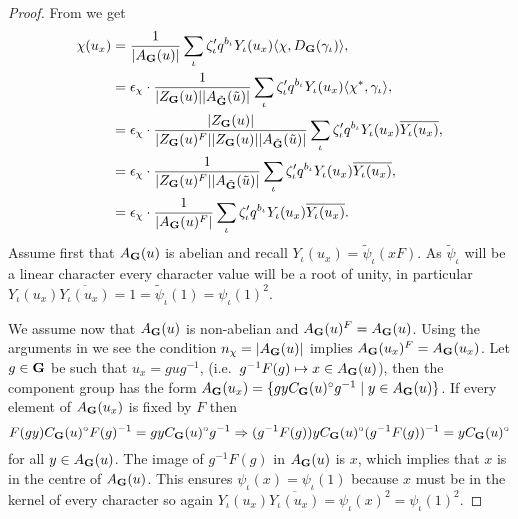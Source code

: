 \documentclass{jt-calcs}
\begin{document}
\begin{proof}
From \cite[Corollary 2.6]{geck:1999:character-sheaves-and-GGGRs} we get
\begin{align*}
\chi(u_x) &= \frac{1}{|A_{\mathbf{G}}(u)|}\sum_{\iota} \zeta_{\iota}' q^{b_{\iota}}Y_{\iota}(u_x)\langle \chi, D_{\mathbf{G}}(\gamma_{\iota}) \rangle,\\
&= \epsilon_{\chi}\cdot \frac{1}{|Z_{\mathbf{G}}(u)||A_{\tilde{\mathbf{G}}}(\tilde{u})|}\sum_{\iota} \zeta_{\iota}' q^{b_{\iota}}Y_{\iota}(u_x)\langle \chi^*, \gamma_{\iota} \rangle,\\
&= \epsilon_{\chi} \cdot \frac{|Z_{\mathbf{G}}(u)|}{|Z_{\mathbf{G}}(u)^F||Z_{\mathbf{G}}(u)||A_{\tilde{\mathbf{G}}}(\tilde{u})|}\sum_{\iota} \zeta_{\iota}' q^{b_{\iota}}Y_{\iota}(u_x)\overline{Y_{\iota}(u_x)},\\
&= \epsilon_{\chi} \cdot \frac{1}{|Z_{\mathbf{G}}(u)^F||A_{\tilde{\mathbf{G}}}(\tilde{u})|}\sum_{\iota} \zeta_{\iota}' q^{b_{\iota}}Y_{\iota}(u_x)\overline{Y_{\iota}(u_x)},\\
&= \epsilon_{\chi} \cdot \frac{1}{|A_{\mathbf{G}}(u)^F|}\sum_{\iota} \zeta_{\iota}' q^{b_{\iota}}Y_{\iota}(u_x)\overline{Y_{\iota}(u_x)}.
\end{align*}
Assume first that $A_{\mathbf{G}}(u)$ is abelian and recall $Y_{\iota}(u_x) = \tilde{\psi}_{\iota}(xF)$. As $\tilde{\psi}_{\iota}$ will be a linear character every character value will be a root of unity, in particular $Y_{\iota}(u_x)\overline{Y_{\iota}(u_x)} = 1 = \tilde{\psi}_{\iota}(1) = \psi_{\iota}(1)^2$.

We assume now that $A_{\mathbf{G}}(u)$ is non-abelian and $A_{\mathbf{G}}(u)^F = A_{\mathbf{G}}(u)$. Using the arguments in \cite[Proposition 3.1]{geck:1999:character-sheaves-and-GGGRs} we see the condition $n_{\chi} = |A_{\mathbf{G}}(u)|$ implies $A_{\mathbf{G}}(u_x)^F = A_{\mathbf{G}}(u_x)$. Let $g \in \mathbf{G}$ be such that $u_x = gug^{-1}$, (i.e.\ $g^{-1}F(g) \mapsto x \in A_{\mathbf{G}}(u)$), then the component group has the form $A_{\mathbf{G}}(u_x) = \{gyC_{\mathbf{G}}(u)^{\circ}g^{-1} \mid y \in A_{\mathbf{G}}(u)\}$. If every element of $A_{\mathbf{G}}(u_x)$ is fixed by $F$ then
\begin{equation*}
F(gy)C_{\mathbf{G}}(u)^{\circ}F(g)^{-1} = gyC_{\mathbf{G}}(u)^{\circ}g^{-1} \Rightarrow (g^{-1}F(g))yC_{\mathbf{G}}(u)^{\circ}(g^{-1}F(g))^{-1} = yC_{\mathbf{G}}(u)^{\circ}
\end{equation*}
for all $y \in A_{\mathbf{G}}(u)$. The image of $g^{-1}F(g)$ in $A_{\mathbf{G}}(u)$ is $x$, which implies that $x$ is in the centre of $A_{\mathbf{G}}(u)$. This ensures $\psi_{\iota}(x) = \psi_{\iota}(1)$ because $x$ must be in the kernel of every character so again $Y_{\iota}(u_x)\overline{Y_{\iota}(u_x)} = \psi_{\iota}(x)^2 = \psi_{\iota}(1)^2$.
\end{proof}
\end{document}
